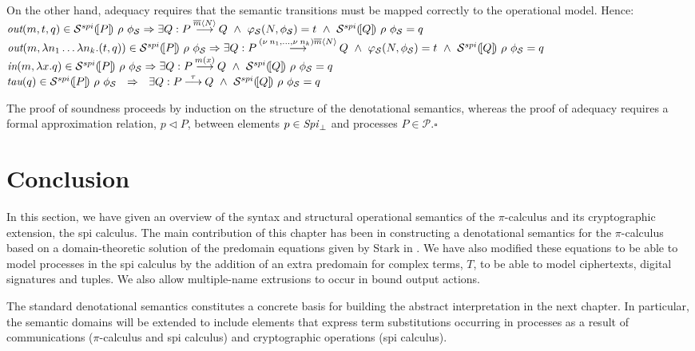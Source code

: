 \documentclass[10pt,a4paper,final,oneside,fleqn]{book}
\newcommand*{\todefout}{\mathbin{\mathop{\longrightarrow}\limits^{\overline{m}\langle N\rangle}}}
\newcommand*{\todefbout}{\mathbin{\mathop{\longrightarrow}\limits^{(\nu~\!n_1,\ldots,\nu~\!n_k)\overline{m}\langle N\rangle}}}
\newcommand*{\todefin}{\mathbin{\mathop{\longrightarrow}\limits^{m(x)}}}
\newcommand*{\todeftau}{\mathbin{\mathop{\longrightarrow}\limits^{\tau}}}
\begin{document}
\noindent
On the other hand, adequacy requires that the semantic transitions must be mapped correctly to the operational model.  Hence:\\
\noindent 
$\mbox{{\itshape out}}(m,t,q)\in\mathcal{S}^{spi}(\![P]\!)~\rho~\phi_\mathcal{S}\Rightarrow\exists Q:P\todefout Q~\wedge~\varphi_\mathcal{S}(N,\phi_\mathcal{S})=t~\wedge~\mathcal{S}^{spi}(\![Q]\!)~\rho~\phi_\mathcal{S}=q$\\
$\mbox{{\itshape out}}(m,\lambda n_1\ldots\lambda n_k.(t,q))\in\mathcal{S}^{spi}(\![P]\!)~\rho~\phi_\mathcal{S}\Rightarrow\exists Q:P\todefbout Q~\wedge~\varphi_\mathcal{S}(N,\phi_\mathcal{S})=t~\wedge~\mathcal{S}^{spi}(\![Q]\!)~\rho~\phi_\mathcal{S}=q$\\
$\mbox{{\itshape in}}(m,\lambda x.q)\in\mathcal{S}^{spi}(\![P]\!)~\rho~\phi_\mathcal{S}\Rightarrow\exists Q:P\todefin Q~\wedge~\mathcal{S}^{spi}(\![Q]\!)~\rho~\phi_\mathcal{S}=q$\\
$\mbox{{\itshape tau}}(q)\in\mathcal{S}^{spi}(\![P]\!)~\rho~\phi_\mathcal{S}~~\Rightarrow~~\exists Q:P\todeftau Q~\wedge~\mathcal{S}^{spi}(\![Q]\!)~\rho~\phi_\mathcal{S}=q$\vspace{5mm}

\noindent
The proof of soundness proceeds by induction on the structure of the denotational semantics, whereas the proof of adequacy requires a formal approximation relation, $p\vartriangleleft P$, between elements $p\in\mbox{{\itshape Spi\/}}_\bot$ and processes $P\in\mathcal{P}$.\hfill$\square$
\section{Conclusion}
In this section, we have given an overview of the syntax and structural operational semantics of the $\pi$-calculus and its cryptographic extension, the spi calculus.  The main contribution of this chapter has been in constructing a denotational semantics for the $\pi$-calculus based on a domain-theoretic solution of the predomain equations given by Stark in \cite{stark1}. We have also modified these equations to be able to model processes in the spi calculus by the addition of an extra predomain for complex terms, $T$, to be able to model ciphertexts, digital signatures and tuples. We also allow multiple-name extrusions to occur in bound output actions.

The standard denotational semantics constitutes a concrete basis for building the abstract interpretation in the next chapter. In particular, the semantic domains will be extended to include elements that express term substitutions occurring in processes as a result of communications ($\pi$-calculus and spi calculus) and cryptographic operations (spi calculus).
\end{document}
